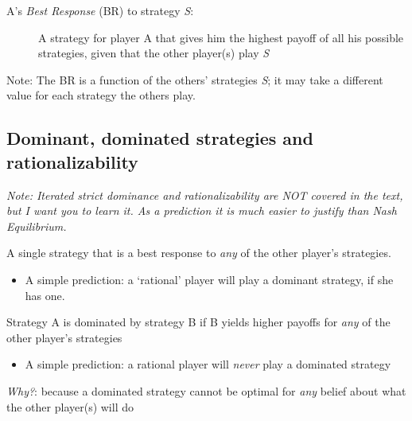 \documentclass[]{article}
\providecommand{\tightlist}{%
  \setlength{\itemsep}{0pt}\setlength{\parskip}{0pt}}
\begin{document}
\begin{description}
\item[A's \emph{Best Response} (BR) to strategy \emph{S}:]
A strategy for player A that gives him the highest payoff of all his possible strategies, given that the other player(s) play \emph{S}
\end{description}

Note: The BR is a function of the others' strategies \emph{S}; it may take a different value for each strategy the others play.

\hypertarget{dominant-dominated-strategies-and-rationalizability}{%
\subsection{Dominant, dominated strategies and rationalizability}\label{dominant-dominated-strategies-and-rationalizability}}

\emph{Note: Iterated strict dominance and rationalizability are NOT covered in the text, but I want you to learn it. As a prediction it is much easier to justify than Nash Equilibrium.}

\bigskip

\begin{description}
\tightlist
\item[Dominant strategy]
A single strategy that is a best response to \emph{any} of the other player's strategies.
\end{description}

\begin{itemize}
\tightlist
\item
  A simple prediction: a `rational' player will play a dominant strategy, if she has one.
\end{itemize}

\begin{description}
\tightlist
\item[Dominated strategy (not in text!)]
Strategy A is dominated by strategy B if B yields higher payoffs for \emph{any} of the other player's strategies
\end{description}

\begin{itemize}
\tightlist
\item
  A simple prediction: a rational player will \emph{never} play a dominated strategy
\end{itemize}

\emph{Why?}: because a dominated strategy cannot be optimal for \emph{any} belief about what the other player(s) will do
\end{document}
